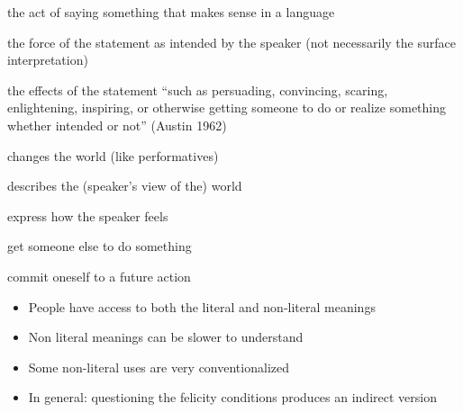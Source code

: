 \documentclass[headrule,footrule]{foils}
\begin{document}
\begin{description}
\item {} the act of saying something that makes
  sense in a language
\item {} the force of the statement  as intended by the speaker (not necessarily the surface interpretation)
\item {} the effects of the statement
``such as persuading, convincing, scaring, enlightening, inspiring, or otherwise getting someone to do or realize something whether intended or not'' (Austin 1962)
\end{description}

  \begin{description}
  \item {} changes the world (like performatives)
  \item {} describes the (speaker's view of the) world 
  \item {}  express how the speaker feels
  \item {} get someone else to do something
  \item {} commit oneself to a future action
  \end{description}



\begin{exe}
  \ex
  \begin{xlist}
    \ex {} 
    \ex {}
  \end{xlist}
  \ex 
  \begin{xlist}
    \ex {}
    \ex {}
  \end{xlist}
  \ex
  \begin{xlist}
    \ex {}
    \ex {}
  \end{xlist}
\end{exe}
\begin{itemize}
\item People have access to both the literal and non-literal meanings
\item Non literal meanings can be slower to understand
\item Some non-literal uses are very conventionalized 
  \\  \into {}
\item In general: questioning the felicity conditions produces an indirect version
\end{itemize}
\end{document}
